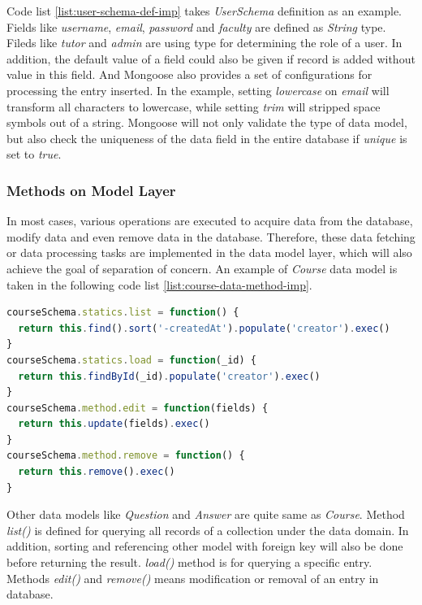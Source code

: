 Code list \ref{list:user-schema-def-imp} takes \textit{UserSchema} definition as an example. Fields like \textit{username}, \textit{email}, \textit{password} and \textit{faculty} are defined as \textit{String} type. Fileds like \textit{tutor} and \textit{admin} are using  type for determining the role of a user. In addition, the default value of a field could also be given if record is added without value in this field. And Mongoose also provides a set of configurations for processing the entry inserted. In the example, setting \textit{lowercase} on \textit{email} will transform all characters to lowercase, while setting \textit{trim} will stripped space symbols out of a string. Mongoose will not only validate the type of data model, but also check the uniqueness of the data field in the entire database if \textit{unique} is set to \textit{true}. 

\subsubsection{Methods on Model Layer}
In most cases, various operations are executed to acquire data from the database, modify data and even remove data in the database. Therefore, these data fetching or data processing tasks are implemented in the data model layer, which will also achieve the goal of separation of concern. An example of \textit{Course} data model is taken in the following code list \ref{list:course-data-method-imp}.

\begin{lstlisting}[language=JavaScript, caption=Example: defining static methods of data model within Mongoose, label={list:course-data-method-imp}]
courseSchema.statics.list = function() {
  return this.find().sort('-createdAt').populate('creator').exec()
}
courseSchema.statics.load = function(_id) {
  return this.findById(_id).populate('creator').exec()
}
courseSchema.method.edit = function(fields) {
  return this.update(fields).exec()
}
courseSchema.method.remove = function() {
  return this.remove().exec()
}
\end{lstlisting}

Other data models like \textit{Question} and \textit{Answer} are quite same as \textit{Course}. Method \textit{list()} is defined for querying all records of a collection under the data domain. In addition, sorting and referencing other model with foreign key will also be done before returning the result. \textit{load()} method is for querying a specific entry. Methods \textit{edit()} and \textit{remove()} means modification or removal of an entry in database.



